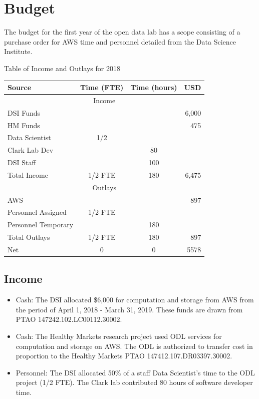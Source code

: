 \section{Budget} %
The budget for the first year of the open data lab has a scope consisting of a purchase order for AWS time and personnel detailed from the Data Science Institute.

\begin{center}
Table of Income and Outlays for 2018

\begin{tabular}{lccr}
\hline
\hline
Source & Time (FTE) & Time (hours) & USD \\
\hline
\multicolumn{4}{c}{Income} \\
\hline
DSI Funds & && 6,000 \\
HM Funds & && 475 \\
Data Scientist & 1/2 & & \\
Clark Lab Dev & & 80 & \\
DSI Staff & & 100 & \\
\hline
Total Income & 1/2 FTE & 180 & 6,475 \\
\hline
\hline
\multicolumn{4}{c}{Outlays} \\
\hline
AWS & && 897 \\
Personnel Assigned & 1/2 FTE &  & \\
Personnel Temporary & & 180 & \\
\hline
Total Outlays & 1/2 FTE & 180 & 897 \\
\hline
\hline
Net & 0 & 0 & 5578 \\
\hline
\hline
\end{tabular}
\end{center}

\subsection{Income}
\begin{itemize}
\item Cash: The DSI allocated \$6,000 for computation and storage from AWS from the period of April 1, 2018 - March 31, 2019. These funds are drawn from PTAO 147242.102.LC00112.30002.
\item Cash: The Healthy Markets research project used ODL services for computation and storage on AWS. The ODL is authorized to transfer cost in proportion to the Healthy Markets PTAO 147412.107.DR03397.30002.
\item Personnel: The DSI allocated 50\% of a staff Data Scientist's time to the ODL project (1/2 FTE). The Clark lab contributed 80 hours of software developer time.
\end{itemize}
